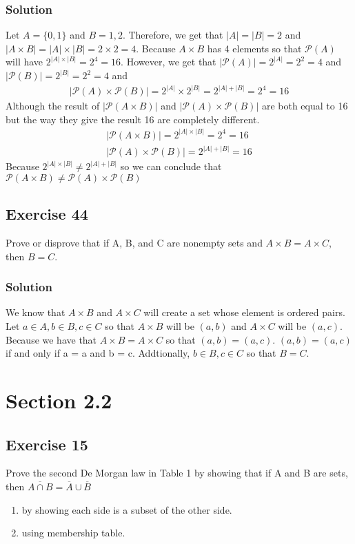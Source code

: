 \documentclass{article}
\theoremstyle{mytheoremstyle}
\theoremstyle{mytheoremstyle}
\theoremstyle{myproblemstyle}
\begin{document}
    \subsubsection*{Solution}
        Let \(A = \{0, 1\}\) and \(B = {1, 2}\). Therefore, we get that \(|A| = |B| = 2\) and \(|A \times B| = |A| \times |B| = 2 \times 2 = 4\).
        Because \(A \times B\) has 4 elements so that \(\mathcal{P}(A)\) will have \(2^{|A|\times|B|} = 2^4 = 16\). However, we get that
        \(|\mathcal{P}(A)| = 2^{|A|} = 2^2 = 4\) and \(|\mathcal{P}(B)| = 2^{|B|} = 2^2 = 4\) and
        \begin{align*}
            |\mathcal{P}(A) \times \mathcal{P}(B)| = 2^{|A|}\times 2^{|B|} = 2^{|A| + |B|} = 2^4 =16
        \end{align*}
        Although the result of \(|\mathcal{P}(A\times B)|\) and \(|\mathcal{P}(A) \times \mathcal{P}(B)|\) are both equal to
        16 but the way they give the result 16 are completely different.
        \begin{align*}
            |\mathcal{P}(A\times B)| = 2^{|A| \times |B|} = 2^4 = 16\\
            |\mathcal{P}(A) \times \mathcal{P}(B)| = 2^{|A| + |B|} = 16
        \end{align*}
        Because \(2^{|A| \times |B|} \neq 2^{|A| + |B|}\) so we can conclude that \(\mathcal{P}(A \times B) \neq \mathcal{P}(A) \times \mathcal{P}(B)\)
    \subsection*{Exercise 44}
        Prove or disprove that if A, B, and C are nonempty sets and \(A \times B = A \times C\), then \(B = C\).
    \subsubsection*{Solution}
        We know that \(A \times B\) and \(A \times C\) will create a set whose element is ordered pairs. 
        Let \(a \in A, b \in B, c \in C\) so that \(A \times B\) will be \((a, b)\) and \(A \times C\) will be \((a, c)\).
        Because we have that \(A \times B = A \times C\) so that \((a,b) = (a,c)\). \((a,b) = (a,c)\) if and only if a = a and b = c.
        Addtionally, \(b \in B, c \in C\) so that \(B = C\).
    \section*{Section 2.2}
    \subsection*{Exercise 15}
        Prove the second De Morgan law in Table 1 by showing that if A and B are sets, then \(\overline{A \cap B} = \overline{A} \cup \overline{B}\)
        \begin{enumerate} [label = (\alph*)]
            \item by showing each side is a subset of the other side.
            \item using membership table.
        \end{enumerate}
\end{document}
